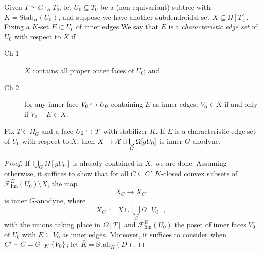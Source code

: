 \documentclass[a4paper,10pt,draft]{article}%
\begin{document}
{\color{blue}
\begin{definition}
      Given $T \simeq G \cdot_H T_0$,
      let $U_0 \subseteq T_0$ be a (non-equivariant) subtree
      with $K = \mathrm{Stab}_H(U_0)$,
      and suppose we have another subdendroidal set $X \subseteq \Omega[T]$.
      Fixing a $K$-set $E \subset U_0$ of inner edges
      We say that $E$ is a \textit{characteristic edge set} of
      $U_0$ with respect to $X$
      if
      \begin{description}
      \item[Ch 1] $X$ contains all proper outer faces of $U_0$; and
      \item[Ch 2] for any inner face $V_0 \hookrightarrow U_0$ containing $E$ as inner edges,
            $V_0 \in X$
            if and only if
            $V_0 - E \in X$.
      \end{description}
\end{definition}

\begin{proposition}
      \label{CHAR_HORN_PROP}
      Fix $T \in \Omega_G$ and 
      a face $U_0 \hookrightarrow T$ with stabilizer $K$.      
      If $E$ is a characteristic edge set of $U_0$ with respect to $X$, then
      $X \to \mathcal{X} \cup \mathop{\bigcup}\limits_{G}\Omega[g U_0]$
      is inner $G$-anodyne.
\end{proposition}
\begin{proof}
      If
      $\bigcup_G \Omega[g U_0]$ is already contained in $X$, we are done.
      Assuming otherwise, it suffices to show that for all
      $C \subseteq C'$ $K$-closed convex subsets of $\mathscr{F}_{\mathrm{Inn}}^{E}(U_0) \setminus X$, the map
      \begin{equation}
            \label{CHAR_HORN_EQ}
            X_C \to X_{C'}
      \end{equation}
      is inner $G$-anodyne,
      where
      \begin{equation}
            X_C
            := X \cup \mathop{\bigcup}\limits_{C}\Omega[V_0],
      \end{equation}
      with the unions taking place in $\Omega[T]$
      and $\mathscr{F}_{\mathrm{Inn}}^{E}(U_0)$ the poset of inner faces $V_0$ of $U_0$
      with $E \subseteq V_0$ as inner edges.
      Moreover, it suffices to consider when $C' - C = G\cdot_K \left\{V_0\right\}$;
      let $\bar K = \mathrm{Stab}_H(D)$.


\end{proof}}
\end{document}
